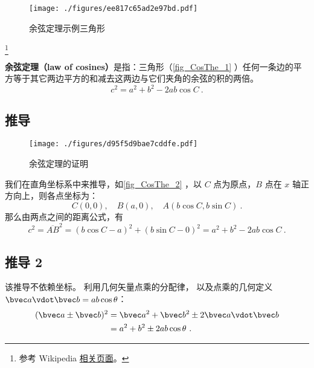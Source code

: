 
\begin{figure}[ht]
\centering
\texttt{[image: ./figures/ee817c65ad2e97bd.pdf]}
\caption{余弦定理示例三角形} \label{fig_CosThe_1}
\end{figure}

\footnote{参考 Wikipedia \href{https://en.wikipedia.org/wiki/Law_of_cosines}{相关页面}。}



\textbf{余弦定理（law of cosines）}是指：三角形（\autoref{fig_CosThe_1} ）任何一条边的平方等于其它两边平方的和减去这两边与它们夹角的余弦的积的两倍。
\begin{equation}\label{eq_CosThe_1}
c^2=a^2 + b^2 - 2ab\cos C~.
\end{equation}


\subsection{推导}
\begin{figure}[ht]
\centering
\texttt{[image: ./figures/d95f5d9bae7cddfe.pdf]}
\caption{余弦定理的证明} \label{fig_CosThe_2}
\end{figure}
我们在直角坐标系中来推导，如\autoref{fig_CosThe_2} ，以 $C$ 点为原点，$B$ 点在 $x$ 轴正方向上，则各点坐标为：
\begin{equation}
C(0,0),\quad B(a,0),\quad A(b\cos C,b\sin C)~.
\end{equation}
那么由两点之间的距离公式，有
\begin{equation}
c^2=\overline{AB}^2=(b\cos C-a)^2+(b\sin C-0)^2=a^2+b^2-2ab\cos C~.
\end{equation}

\subsection{推导 2}
该推导不依赖坐标。 利用几何矢量点乘的分配律， 以及点乘的几何定义 $\bvec a \vdot \bvec b = ab\cos\theta$：
\begin{equation}\label{eq_CosThe_2}
\begin{aligned}
(\bvec a \pm \bvec b)^2 &= \bvec a^2 + \bvec b^2 \pm 2\bvec a \vdot \bvec b\\
&= a^2 + b^2 \pm 2ab \cos\theta~.
\end{aligned}
\end{equation}
